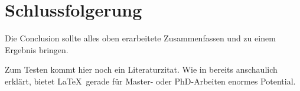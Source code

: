 \documentclass[12pt,pagesize,twoside,DIV=12,headsepline=0.4pt]{scrbook}
\begin{document}
\chapter{Schlussfolgerung}
\label{ch:schlussfolgerung}

Die Conclusion sollte alles oben erarbeitete Zusammenfassen und zu einem Ergebnis bringen.

Zum Testen kommt hier noch ein Literaturzitat. Wie in \cite{Dockner2010} bereits anschaulich erklärt, bietet \LaTeX\ gerade für Master- oder PhD-Arbeiten enormes Potential.



\listoffigures   	%
\listoftables     	%



 



\end{document}
